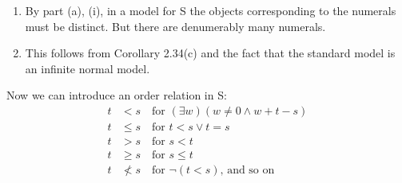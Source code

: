 \begin{enumerate} [label = \alph*.]
\begin{enumerate} [label = \roman*.]
\begin{enumerate} [label = \arabic*.]
\begin{tabular}{p{8cm} r}
                \end{tabular}
        \end{enumerate}
            \item We use induction in the metalanguage.
            \begin{enumerate} [label = \arabic*.]
                \item First, $\overline{m + 0}$ is $\overline{m}$.
                \item Hence, $\proves \overline{m+0}= \overline{m} + \overline{0}$ by (S5').
                \item Now assume $\proves \overline{m+n} = \overline{m} + \overline{n}$.
                \item Then $\proves \big(\overline{m+n}\big)' = \overline{m}+(\overline{n})'$ by (S2') and (S6').
                \item But, $\overline{m+(n+1)}$ is $\big(\overline{m+n}\big)'$ and $\overline{n+1}$ is $(\overline{n})'$.
                \item Hence, $\proves \overline{m+(n+1)} = \overline{m}+\big(\overline{n+1}\big)$.
                \item Thus, $\proves \overline{m+n} = \overline{m} + \overline{n}$.
                \item The proof that $\proves \overline{m \cdot n} = \overline{m} \cdot \overline{n}$ is left as an exercise for the reader.\footnote{$\ $For those taking (or who have taken) CS 374, notice how similar this is to string induction in the first few weeks!}
            \end{enumerate}
    \end{enumerate}
    \item By part (a), (i), in a model for S the objects corresponding to the numerals must be distinct. But there are denumerably many numerals.
    \item This follows from Corollary 2.34(c) and the fact that the standard model is an infinite normal model.
\end{enumerate}

Now we can introduce an order relation in S:
\begin{align*}
    t & < s \quad \text{for }(\exists w)(w\not = 0 \land w + t - s) \\
    t & \leq s \quad \text{for } t < s \lor t = s \\
    t & > s \quad \text{for } s < t \\
    t & \geq s \quad \text{for } s \leq t \\
    t & \not < s \quad \text{for } \lnot(t<s)\text{, and so on}
\end{align*}

